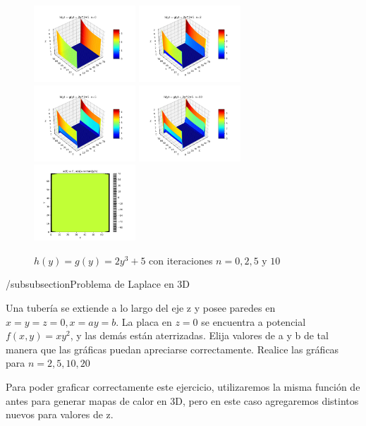 \documentclass[10pt,journal,compsoc]{IEEEtran}
\begin{document}
\begin{figure}
  \centering
  \includegraphics[width=1.5in]{images/2y3-n0}
  \includegraphics[width=1.5in]{images/2y3-n2}
  \includegraphics[width=1.5in]{images/2y3-n5}
  \includegraphics[width=1.5in]{images/2y3-n10}
  \includegraphics[width=1.5in]{images/2y3-density}
  \caption{\(h(y) = g(y) = 2y^3+5\) con iteraciones \(n = 0, 2, 5 \text{ y } 10\)}
  \label{2y3-iterations}
\end{figure}

/subsubsection{Problema de Laplace en 3D}

Una tubería se extiende a lo largo del eje z
y posee paredes en \(x = y = z=0,x=a y=b\). La placa en \(z=0\) se encuentra a potencial
\(f(x,y) = xy^2\), y las demás están aterrizadas.
Elija valores de a y b de tal manera que las gráficas puedan apreciarse correctamente.
Realice las gráficas para \(n= 2, 5, 10, 20\)

Para poder graficar correctamente este ejercicio, utilizaremos la misma función de antes para
generar mapas de calor en 3D, pero en este caso agregaremos distintos nuevos para valores de z.
\end{document}
